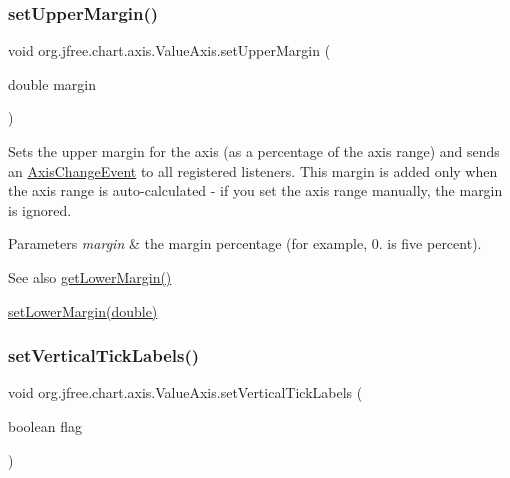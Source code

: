 \subsubsection{\texorpdfstring{set\+Upper\+Margin()}{setUpperMargin()}}
{\footnotesize\ttfamily void org.\+jfree.\+chart.\+axis.\+Value\+Axis.\+set\+Upper\+Margin (\begin{DoxyParamCaption}\item[{double}]{margin }\end{DoxyParamCaption})}

Sets the upper margin for the axis (as a percentage of the axis range) and sends an \mbox{\hyperlink{}{Axis\+Change\+Event}} to all registered listeners. This margin is added only when the axis range is auto-\/calculated -\/ if you set the axis range manually, the margin is ignored.


\begin{DoxyParams}{Parameters}
{\em margin} & the margin percentage (for example, 0. is five percent).\\
\hline
\end{DoxyParams}
\begin{DoxySeeAlso}{See also}
\mbox{\hyperlink{classorg_1_1jfree_1_1chart_1_1axis_1_1_value_axis_aad1a68a143582b583b76f5b632014f50}{get\+Lower\+Margin()}} 

\mbox{\hyperlink{classorg_1_1jfree_1_1chart_1_1axis_1_1_value_axis_a74bac229eb07e3502a9ca3934563a636}{set\+Lower\+Margin(double)}} 
\end{DoxySeeAlso}
\mbox{\label{classorg_1_1jfree_1_1chart_1_1axis_1_1_value_axis_a748957d44aba12f460d90707e434f336}} 
\subsubsection{\texorpdfstring{set\+Vertical\+Tick\+Labels()}{setVerticalTickLabels()}}
{\footnotesize\ttfamily void org.\+jfree.\+chart.\+axis.\+Value\+Axis.\+set\+Vertical\+Tick\+Labels (\begin{DoxyParamCaption}\item[{boolean}]{flag }\end{DoxyParamCaption})}

